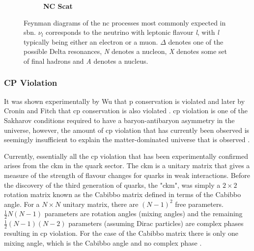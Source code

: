 \begin{figure}[h!]
\begin{subfigure}{0.3\linewidth}
\centering \textbf{NC \electron Scat} \\ \vspace{0.3cm}
\end{subfigure}
\caption[Feynman diagrams of the \gls{nc} processes most commonly expected in \gls{sbn}.]{Feynman diagrams of the \gls{nc} processes most commonly expected in \gls{sbn}. $\nu_l$ corresponds to the neutrino with leptonic flavour \textit{l}, with \textit{l} typically being either an electron or a muon. $\Delta$ denotes one of the possible Delta resonances, \textit{N} denotes a nucleon, \textit{X} denotes some set of final hadrons and \textit{A} denotes a nucleus.}
\label{fig:NC_Feynman_diagrams}
\end{figure}

\subsubsection{CP Violation}\label{subsubsec:CP_violation}

It was shown experimentally by Wu that \gls{p} conservation is violated and later by Cronin and Fitch that \gls{cp} conservation is also violated \cite{Wu_experiment}\cite{Cronin_and_Fitch_experiment}. \gls{cp} violation is one of the Sakharov conditions required to have a baryon-antibaryon asymmetry in the universe, however, the amount of \gls{cp} violation that has currently been observed is seemingly insufficient to explain the matter-dominated universe that is observed \cite{Sakharov_conditions}.

Currently, essentially all the \gls{cp} violation that has been experimentally confirmed arises from the \gls{ckm} in the quark sector. The \gls{ckm} is a unitary matrix that gives a measure of the strength of flavour changes for quarks in weak interactions. Before the discovery of the third generation of quarks, the "\gls{ckm}", was simply a $2 \times 2$ rotation matrix known as the Cabibbo matrix defined in terms of the Cabibbo angle. For a $N \times N$ unitary matrix, there are $(N-1)^2$ free parameters. $\frac{1}{2}N(N-1)$ parameters are rotation angles (mixing angles) and the remaining $\frac{1}{2}(N-1)(N-2)$ parameters (assuming Dirac particles) are complex phases resulting in \gls{cp} violation. For the case of the Cabibbo matrix there is only one mixing angle, which is the Cabibbo angle and no complex phase \cite{Fundamentals_of_Neutrino_Physics_and_Astrophysics} \cite{leptonic_cp_violation}. 

